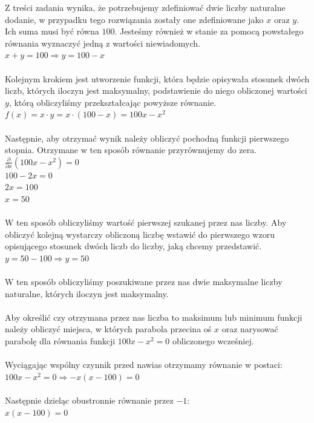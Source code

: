\documentclass[UTF8]{article}
\begin{document}
Z treści zadania wynika, że potrzebujemy zdefiniować dwie liczby naturalne dodanie, w przypadku tego rozwiązania zostały one zdefiniowane jako $x$ oraz $y$. Ich suma musi być równa $100$. Jesteśmy również w stanie za pomocą powstałego równania wyznaczyć jedną z wartości niewiadomych. ~
\\$x + y = 100 \Rightarrow y = 100 - x $\\
\\Kolejnym krokiem jest utworzenie funkcji, która będzie opisywała stosunek dwóch liczb, których iloczyn jest maksymalny, podstawienie do niego obliczonej wartości $y$, którą obliczyliśmy przekształcając powyższe równanie.~
\\$ f(x) = x \cdot y = x \cdot (100-x) = 100x - x^{2} $\\
\\Następnie, aby otrzymać wynik należy obliczyć pochodną funkcji pierwszego stopnia. Otrzymane w ten sposób równanie przyrównujemy do zera. ~
\\$ \frac{\partial}{\partial x}(100x - x^{2}) = 0$
\\$100 - 2x = 0$
\\$2x = 100$
\\$x = 50 $\\
\\W ten sposób obliczyliśmy wartość pierwszej szukanej przez nas liczby. Aby obliczyć kolejną wystarczy obliczoną liczbę wstawić do pierwszego wzoru opisującego stosunek dwóch liczb do liczby, jaką chcemy przedstawić.~
\\$ y = 50 - 100 \Rightarrow y = 50 $\\
\\W ten sposób obliczyliśmy poszukiwane przez nas dwie maksymalne liczby naturalne, których iloczyn jest maksymalny.~\\
\\Aby określić czy otrzymana przez nas liczba to maksimum lub minimum funkcji należy obliczyć miejsca, w których parabola przecina oś $x$ oraz narysować parabolę dla równania funkcji $100x - x^{2} = 0$ obliczonego wcześniej. ~\\
\\Wyciągając wspólny czynnik przed nawias otrzymamy równanie w postaci:~
\\$100x - x^{2} = 0 \Rightarrow -x(x-100)=0$\\
\\Następnie dzieląc obustronnie równanie przez $-1$:~
\\$x(x-100)=0$\\
\end{document}
